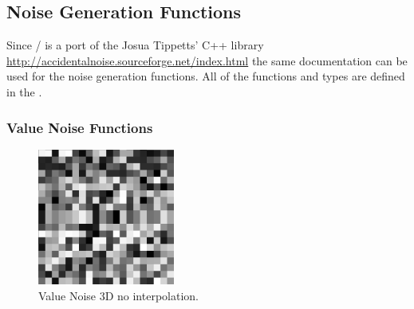 %
%
%
%

\subsection{Noise Generation Functions}

Since \ANLOpenCL/ is a port of the Josua Tippetts' C++ library
\url{http://accidentalnoise.sourceforge.net/index.html} the same documentation
can be used for the noise generation functions.
All of the functions and types are defined in the .

\subsubsection{Value Noise Functions}

\begin{figure}[h]
\centering
\includegraphics[width=0.4\textwidth]{out/noise_functions/value_noise3D_noInterp.png}
\caption{Value Noise 3D no interpolation.}
\label{fig:value_noise3D_noInterp}
\end{figure}

